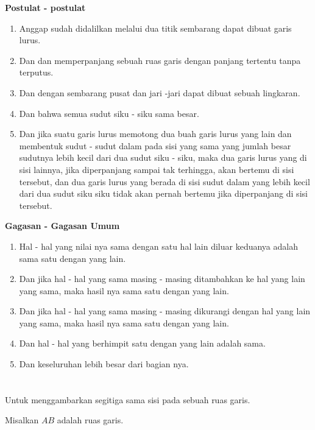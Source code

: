 \documentclass[a4paper, 12pt]{book}
\begin{document}
\begin{center}
\textbf{Postulat - postulat}
\end{center}
\begin{enumerate}
\item Anggap sudah didalilkan melalui dua titik sembarang dapat dibuat garis lurus.
\item Dan dan memperpanjang sebuah ruas garis dengan panjang tertentu tanpa terputus.
\item Dan dengan sembarang pusat dan jari -jari dapat dibuat sebuah lingkaran.
\item Dan bahwa semua sudut siku - siku sama besar.
\item Dan jika suatu garis lurus memotong dua buah garis lurus yang lain dan membentuk sudut - sudut dalam pada sisi yang sama yang jumlah besar sudutnya lebih kecil dari dua  sudut siku - siku, maka dua garis lurus yang di sisi lainnya, jika diperpanjang sampai tak terhingga, akan bertemu di sisi tersebut, dan dua garis lurus yang berada di sisi sudut dalam yang lebih kecil dari dua sudut siku siku tidak akan pernah bertemu jika diperpanjang di sisi tersebut.
\end{enumerate}

\begin{center}
\textbf{Gagasan - Gagasan Umum}
\end{center}
\begin{enumerate}
\item Hal - hal yang nilai nya sama dengan satu hal lain diluar keduanya adalah sama satu dengan yang lain. 
\item Dan jika hal - hal yang sama masing - masing ditambahkan ke hal yang lain yang sama, maka hasil nya sama satu dengan yang lain. 
\item Dan jika hal - hal yang sama masing - masing dikurangi dengan hal yang lain yang sama, maka hasil nya sama satu dengan yang lain. 
\item Dan hal - hal yang berhimpit satu dengan yang lain adalah sama.
\item Dan keseluruhan lebih besar dari bagian nya.
\end{enumerate}

\section*{\centering \thesection} 
Untuk menggambarkan segitiga sama sisi pada sebuah ruas garis.  

Misalkan $AB$ adalah ruas garis.
\end{document}
